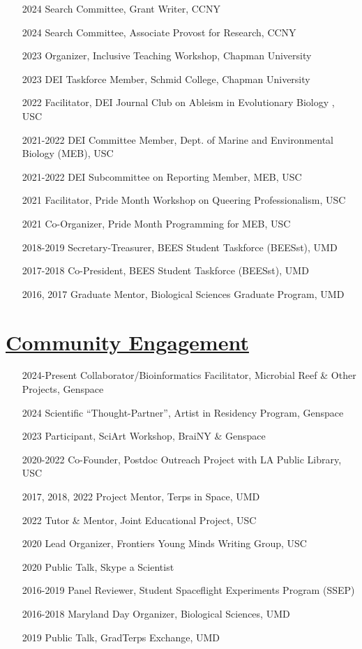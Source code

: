 \documentclass[]{res}
\begin{document}
\begin{resume}
\begin{itemize}
\item[2024] {Search Committee,} Grant Writer, CCNY
\item[2024] {Search Committee,} Associate Provost for Research, CCNY
\item[2023] {Organizer,} {Inclusive Teaching Workshop}, Chapman University
\item[2023] {DEI Taskforce Member,} {Schmid College}, Chapman University
\item[2022] {Facilitator,} DEI Journal Club on Ableism in Evolutionary Biology , USC
\item[2021-2022] {DEI Committee Member,} {Dept. of Marine and Environmental Biology (MEB)}, USC
\item[2021-2022] {DEI Subcommittee on Reporting Member,} {MEB}, USC
\item[2021] {Facilitator,} {Pride Month Workshop on Queering Professionalism}, USC
\item[2021] {Co-Organizer,} {Pride Month Programming for MEB}, USC
\item[2018-2019] {Secretary-Treasurer,} {BEES Student Taskforce (BEESst)}, UMD
\item[2017-2018] {Co-President,} {BEES Student Taskforce (BEESst)}, UMD
\item[2016, 2017] {Graduate Mentor,} {Biological Sciences Graduate Program}, UMD
\end{itemize}




\section{\underline{Community Engagement}}
\begin{itemize}
\item[2024-Present] {Collaborator/Bioinformatics Facilitator}, Microbial Reef \& Other Projects, Genspace
\item[2024] {Scientific ``Thought-Partner''}, Artist in Residency Program, Genspace
\item[2023] {Participant,} SciArt Workshop, BraiNY \& Genspace
\item[2020-2022] {Co-Founder,} Postdoc Outreach Project with LA Public Library, USC
\item[2017, 2018, 2022] {Project Mentor,} Terps in Space, UMD
\item[2022] {Tutor \& Mentor,} Joint Educational Project, USC
\item[2020] {Lead Organizer,} Frontiers Young Minds Writing Group, USC
\item[2020] {Public Talk,} Skype a Scientist
\item[2016-2019] {Panel Reviewer,} Student Spaceflight Experiments Program (SSEP)
\item[2016-2018] {Maryland Day Organizer,} Biological Sciences, UMD
\item[2019] {Public Talk,} GradTerps Exchange, UMD
\end{itemize}
  

\end{resume}
\end{document}
